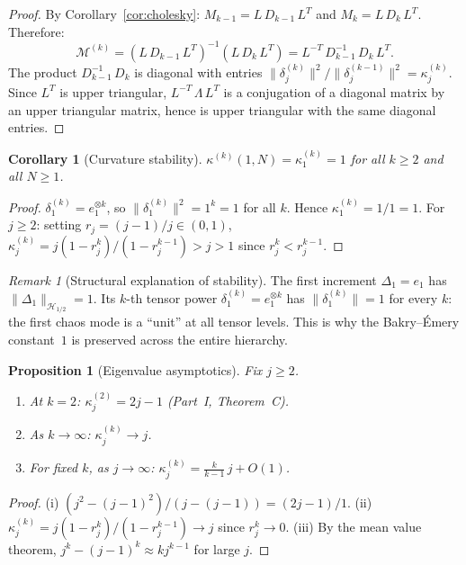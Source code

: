 \documentclass[11pt,a4paper]{article}
\theoremstyle{plain}
\newtheorem{proposition}[theorem]{Proposition}
\newtheorem{corollary}[theorem]{Corollary}
\theoremstyle{definition}
\theoremstyle{remark}
\newtheorem{remark}[theorem]{Remark}
\begin{document}
\begin{proof}
By Corollary~\ref{cor:cholesky}:
$M_{k-1} = L\,D_{k-1}\,L^T$ and $M_k = L\,D_k\,L^T$.
Therefore:
\[
  \mathcal{M}^{(k)}
  = (L\,D_{k-1}\,L^T)^{-1}(L\,D_k\,L^T)
  = L^{-T}\,D_{k-1}^{-1}\,D_k\,L^T.
\]
The product $D_{k-1}^{-1}\,D_k$ is diagonal with entries
$\|\delta_j^{(k)}\|^2 / \|\delta_j^{(k-1)}\|^2
= \kappa_j^{(k)}$.
Since $L^T$ is upper triangular,
$L^{-T}\,\Lambda\,L^T$ is a conjugation of a diagonal
matrix by an upper triangular matrix, hence is upper
triangular with the same diagonal entries.
\end{proof}

\begin{corollary}[Curvature stability]
\label{cor:stability}
$\kappa^{(k)}(1,N) = \kappa_1^{(k)} = 1$ for all
$k \geq 2$ and all $N \geq 1$.
\end{corollary}

\begin{proof}
$\delta_1^{(k)} = e_1^{\otimes k}$, so
$\|\delta_1^{(k)}\|^2 = 1^k = 1$ for all $k$.
Hence $\kappa_1^{(k)} = 1/1 = 1$.
For $j \geq 2$: setting $r_j = (j{-}1)/j \in (0,1)$,
$\kappa_j^{(k)} = j(1-r_j^k)/(1-r_j^{k-1}) > j > 1$
since $r_j^k < r_j^{k-1}$.
\end{proof}

\begin{remark}[Structural explanation of stability]
\label{rem:stability}
The first increment $\Delta_1 = e_1$ has
$\|\Delta_1\|_{\mathcal{H}_{1/2}} = 1$.
Its $k$-th tensor power $\delta_1^{(k)} = e_1^{\otimes k}$
has $\|\delta_1^{(k)}\| = 1$ for every $k$:
the first chaos mode is a ``unit'' at all tensor levels.
This is why the Bakry--\'Emery constant~$1$ is preserved
across the entire hierarchy.
\end{remark}

\begin{proposition}[Eigenvalue asymptotics]
\label{prop:asymptotics}
Fix $j \geq 2$.
\begin{enumerate}[label=\textup{(\roman*)}]
\item At $k = 2$:
  $\kappa_j^{(2)} = 2j - 1$ (Part~I, Theorem~C).
\item As $k \to \infty$:
  $\kappa_j^{(k)} \to j$.
\item For fixed $k$, as $j \to \infty$:
  $\kappa_j^{(k)} = \frac{k}{k-1}\,j + O(1)$.
\end{enumerate}
\end{proposition}

\begin{proof}
(i) $(j^2-(j{-}1)^2)/(j-(j{-}1)) = (2j-1)/1$.
(ii) $\kappa_j^{(k)} = j(1-r_j^k)/(1-r_j^{k-1}) \to j$
since $r_j^k \to 0$.
(iii) By the mean value theorem,
$j^k - (j{-}1)^k \approx kj^{k-1}$ for large $j$.
\end{proof}
\end{document}
